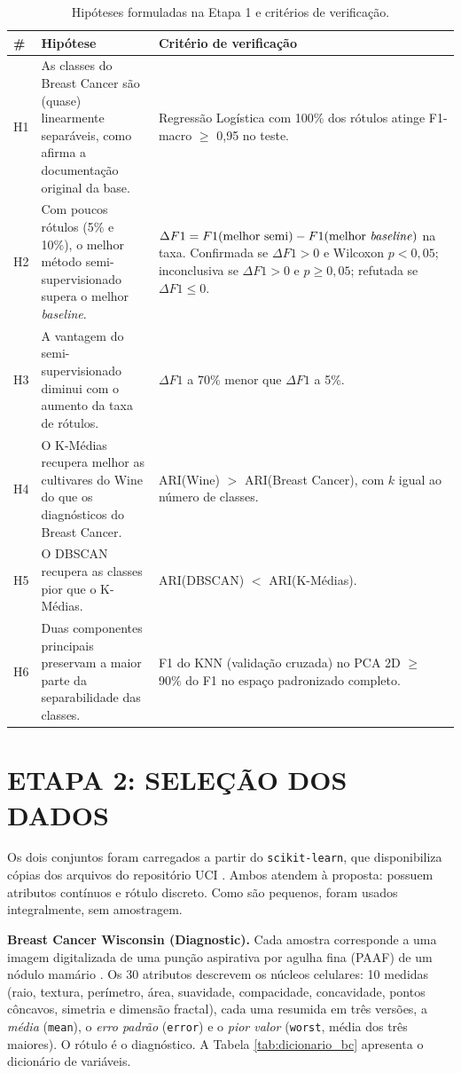 \begin{table}[htbp]
\centering
\caption{Hipóteses formuladas na Etapa 1 e critérios de verificação.}
\label{tab:hipoteses}
\footnotesize
\begin{tabular}{p{0.6cm} p{6.4cm} p{7.2cm}}
\toprule
\textbf{\#} & \textbf{Hipótese} & \textbf{Critério de verificação} \\
\midrule
H1 & As classes do Breast Cancer são (quase) linearmente separáveis, como afirma a documentação original da base. & Regressão Logística com 100\% dos rótulos atinge F1-macro $\geq$ 0,95 no teste. \\
\addlinespace
H2 & Com poucos rótulos (5\% e 10\%), o melhor método semi-supervisionado supera o melhor \textit{baseline}. & $\Delta F1 = F1(\text{melhor semi}) - F1(\text{melhor \textit{baseline}})$ na taxa. Confirmada se $\Delta F1 > 0$ e Wilcoxon $p < 0{,}05$; inconclusiva se $\Delta F1 > 0$ e $p \geq 0{,}05$; refutada se $\Delta F1 \leq 0$. \\
\addlinespace
H3 & A vantagem do semi-supervisionado diminui com o aumento da taxa de rótulos. & $\Delta F1$ a 70\% menor que $\Delta F1$ a 5\%. \\
\addlinespace
H4 & O K-Médias recupera melhor as cultivares do Wine do que os diagnósticos do Breast Cancer. & ARI(Wine) $>$ ARI(Breast Cancer), com $k$ igual ao número de classes. \\
\addlinespace
H5 & O DBSCAN recupera as classes pior que o K-Médias. & ARI(DBSCAN) $<$ ARI(K-Médias). \\
\addlinespace
H6 & Duas componentes principais preservam a maior parte da separabilidade das classes. & F1 do KNN (validação cruzada) no PCA 2D $\geq$ 90\% do F1 no espaço padronizado completo. \\
\bottomrule
\end{tabular}
\end{table}

\section{ETAPA 2: SELEÇÃO DOS DADOS}

Os dois conjuntos foram carregados a partir do \texttt{scikit-learn}, que disponibiliza cópias dos arquivos do repositório UCI \citep{wolberg1995breast, aeberhard1991wine}. Ambos atendem à proposta: possuem atributos contínuos e rótulo discreto. Como são pequenos, foram usados integralmente, sem amostragem.

\textbf{Breast Cancer Wisconsin (Diagnostic).} Cada amostra corresponde a uma imagem digitalizada de uma punção aspirativa por agulha fina (PAAF) de um nódulo mamário \citep{street1993nuclear}. Os 30 atributos descrevem os núcleos celulares: 10 medidas (raio, textura, perímetro, área, suavidade, compacidade, concavidade, pontos côncavos, simetria e dimensão fractal), cada uma resumida em três versões, a \textit{média} (\texttt{mean}), o \textit{erro padrão} (\texttt{error}) e o \textit{pior valor} (\texttt{worst}, média dos três maiores). O rótulo é o diagnóstico. A Tabela \ref{tab:dicionario_bc} apresenta o dicionário de variáveis.

